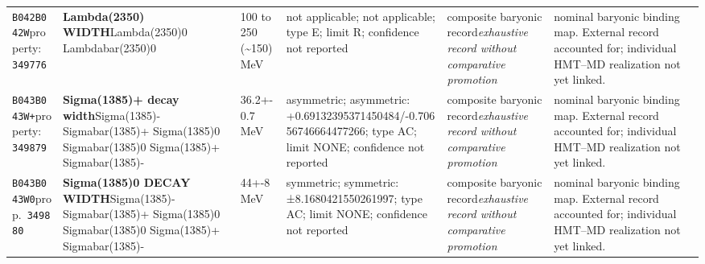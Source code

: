 \begin{landscape}
\begin{longtable}{L{1.85cm}L{4.45cm}L{2.35cm}L{4.05cm}L{3.35cm}L{7.15cm}}
\texttt{B042}\newline \texttt{B042W}\newline property:\ \texttt{349776} & \textbf{Lambda(2350) WIDTH}\newline Lambda(2350)0 \textbar{}\allowbreak{} Lambdabar(2350)0 & 100 to 250 (\textasciitilde{}150)\,MeV & not applicable; not applicable; type E; limit R; confidence not reported & composite baryonic record\newline \emph{exhaustive record without comparative promotion} & nominal baryonic binding map. External record accounted for; individual HMT--MD realization not yet linked. \\
\texttt{B043}\newline \texttt{B043W+}\newline property:\ \texttt{349879} & \textbf{Sigma(1385)+ decay width}\newline Sigma(1385)- \textbar{}\allowbreak{} Sigmabar(1385)+ \textbar{}\allowbreak{} Sigma(1385)0 \textbar{}\allowbreak{} Sigmabar(1385)0 \textbar{}\allowbreak{} Sigma(1385)+ \textbar{}\allowbreak{} Sigmabar(1385)- & 36.2+-0.7\,MeV & asymmetric; asymmetric: +0.69132395371450484/-0.70656746664477266; type AC; limit NONE; confidence not reported & composite baryonic record\newline \emph{exhaustive record without comparative promotion} & nominal baryonic binding map. External record accounted for; individual HMT--MD realization not yet linked. \\
\texttt{B043}\newline \texttt{B043W0}\newline prop.\ \texttt{349880} & \textbf{Sigma(1385)0 DECAY WIDTH}\newline Sigma(1385)- \textbar{}\allowbreak{} Sigmabar(1385)+ \textbar{}\allowbreak{} Sigma(1385)0 \textbar{}\allowbreak{} Sigmabar(1385)0 \textbar{}\allowbreak{} Sigma(1385)+ \textbar{}\allowbreak{} Sigmabar(1385)- & 44+-8\,MeV & symmetric; symmetric: ±8.1680421550261997; type AC; limit NONE; confidence not reported & composite baryonic record\newline \emph{exhaustive record without comparative promotion} & nominal baryonic binding map. External record accounted for; individual HMT--MD realization not yet linked. \\

\end{longtable}
\end{landscape}
